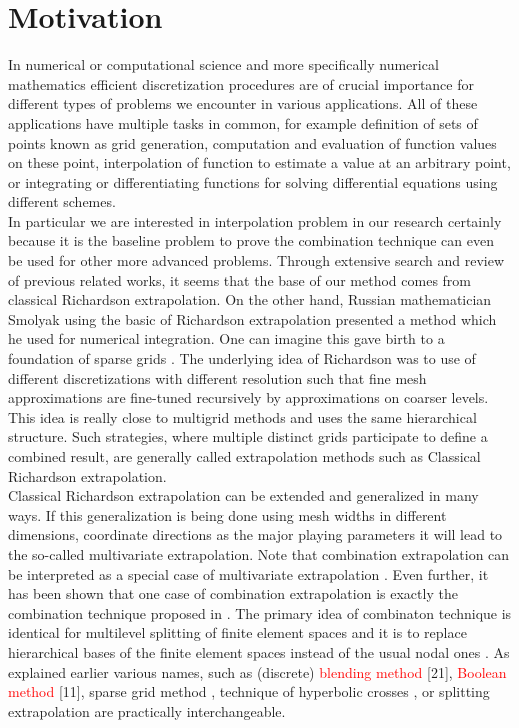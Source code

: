 \section{Motivation}
In numerical or computational science and more specifically numerical mathematics efficient discretization procedures are of crucial importance for different types of problems we encounter in various applications. All of these applications have multiple tasks in common, for example definition of sets of points known as grid generation, computation and evaluation of function values on these point, interpolation of function to estimate a value at an arbitrary point, or integrating or differentiating functions for solving differential equations using different schemes.\\
In particular we are interested in interpolation problem in our research certainly because it is the baseline problem to prove the combination technique can even be used for other more advanced problems. Through extensive search and review of previous related works, it seems that the base of our method comes from classical Richardson extrapolation\cite{Rude1994}. On the other hand, Russian mathematician Smolyak using the basic of Richardson extrapolation presented a method which he used for numerical integration. One can imagine this gave birth to a foundation of sparse grids \cite{smolyak63quadrature}.
The underlying idea of Richardson was to use of different discretizations with different resolution such that fine mesh approximations are fine-tuned recursively by approximations on coarser levels. This idea is really close to multigrid methods and uses the same hierarchical structure.  Such strategies, where multiple distinct grids participate to define a combined  result, are generally called extrapolation methods such as Classical Richardson extrapolation.\\
Classical Richardson extrapolation can be extended and generalized in many ways. If this generalization is being done using  mesh widths in different dimensions, coordinate directions as the major playing parameters it will lead to the so-called multivariate extrapolation\cite{Rude1994}. Note that combination extrapolation can be interpreted as a special case of multivariate extrapolation \cite{Griebel1992, Rude92extrapolationand}. Even further, it has been shown that one case of combination extrapolation is exactly the combination technique proposed in \cite{Griebel1992b}. The primary idea of combinaton technique is identical for multilevel splitting of finite element spaces and it is to replace hierarchical bases of the finite element spaces instead of the usual nodal ones \cite{Yserentant1986}. As explained earlier various names, such as (discrete) \textcolor{red}{blending method} \cite{}[21], \textcolor{red}{Boolean method} \cite{}[11], sparse grid method \cite{Gerstner1998}, technique of hyperbolic crosses \cite{Griebel1998}, or splitting extrapolation \cite{Zumbusch2000} are practically interchangeable.  %
